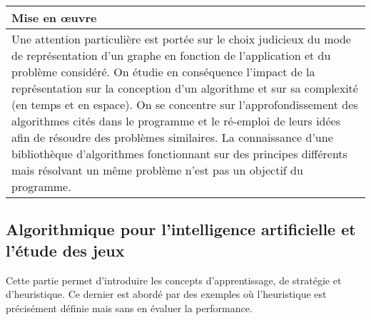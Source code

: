 \begin{longtable}{|p{\lnotion}|p{\comment}|}
\hline
    \multicolumn{2}{|p{\lmoe}|}{\textbf{Mise en \oe uvre}} \\
    \hline
    \multicolumn{2}{|p{\lmoe}|}{
    Une attention particulière est portée sur le choix judicieux du mode de représentation d'un graphe en fonction de l'application et du problème considéré. 
    On étudie en conséquence l'impact de la représentation sur la conception d'un algorithme et sur sa complexité (en temps et en espace).
    On se concentre sur l'approfondissement des algorithmes cités dans le programme et le ré-emploi de leurs idées afin de résoudre des problèmes similaires. La connaissance d'une bibliothèque d'algorithmes fonctionnant sur des principes différents mais résolvant un même problème n'est pas un objectif du programme.
    } \\
    \hline
\end{longtable}

\subsection{Algorithmique pour l'intelligence artificielle et l'étude des jeux \semTroisQuatre}
Cette partie permet d'introduire les concepts d'apprentissage, de stratégie et d'heuristique. Ce dernier est abordé par des exemples où l'heuristique est précisément définie mais sans en évaluer la performance.

